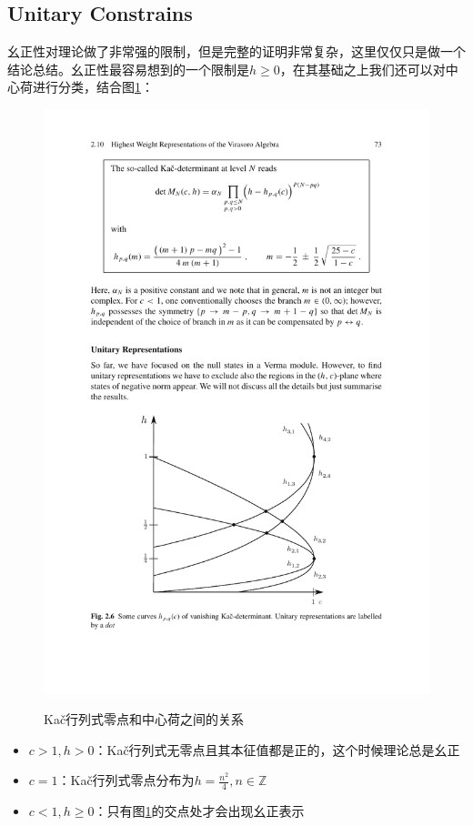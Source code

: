\subsection{Unitary Constrains}
幺正性对理论做了非常强的限制，但是完整的证明非常复杂，这里仅仅只是做一个结论总结。幺正性最容易想到的一个限制是$h\geq 0$，在其基础之上我们还可以对中心荷进行分类，结合图\ref{unitary}：
\begin{figure}[htbp]
	\centering
	\includegraphics{figs/fig16.pdf}
	\label{unitary}
	\caption{Ka\v{c}行列式零点和中心荷之间的关系}
\end{figure}
\begin{itemize}
	\item $c>1,h> 0$：Ka\v{c}行列式无零点且其本征值都是正的，这个时候理论总是幺正
	\item $c=1$：Ka\v{c}行列式零点分布为$h=\frac{n^2}{4},n\in\mathbb{Z}$
	\item $c<1,h\geq 0$：只有图\ref{unitary}的交点处才会出现幺正表示
\end{itemize}
